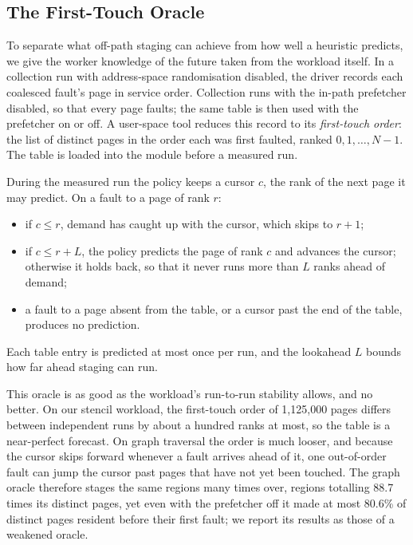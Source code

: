 \subsection{The First-Touch Oracle}
\label{sec:design-oracle}

To separate what off-path staging can achieve from how well a heuristic
predicts, we give the worker knowledge of the future taken from the workload
itself. In a collection run with address-space randomisation disabled, the
driver records each coalesced fault's page in service order. Collection
runs with the in-path prefetcher disabled, so that every page faults; the
same table is then used with the prefetcher on or off. A user-space
tool reduces this record to its \emph{first-touch order}: the list of
distinct pages in the order each was first faulted, ranked
$0, 1, \ldots, N-1$. The table is loaded into the module before a measured
run.

During the measured run the policy keeps a cursor $c$, the rank of the next
page it may predict. On a fault to a page of rank $r$:
\begin{itemize}
  \item if $c \le r$, demand has caught up with the cursor, which skips to
        $r + 1$;
  \item if $c \le r + L$, the policy predicts the page of rank $c$ and
        advances the cursor; otherwise it holds back, so that it never runs
        more than $L$ ranks ahead of demand;
  \item a fault to a page absent from the table, or a cursor past the end of
        the table, produces no prediction.
\end{itemize}
Each table entry is predicted at most once per run, and the lookahead $L$
bounds how far ahead staging can run.

This oracle is as good as the workload's run-to-run stability allows, and
no better. On our stencil workload, the first-touch order of 1{,}125{,}000
pages differs between independent runs by about a hundred ranks at most, so the table is
a near-perfect forecast. On graph traversal the order is much looser, and
because the cursor skips forward whenever a fault arrives ahead of it, one
out-of-order fault can jump the cursor past pages that have not yet been
touched. The graph oracle therefore stages the same regions many times over,
regions totalling 88.7 times its distinct pages, yet even with the prefetcher off
it made at most 80.6\% of distinct pages resident before their first fault; we
report its results as those of a weakened oracle.

